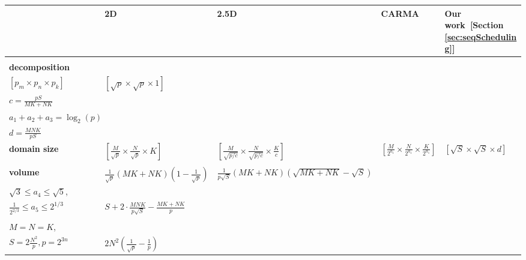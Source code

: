 \documentclass[sigplan,review,anonymous]{acmart}\settopmatter{printfolios=true,printccs=false,printacmref=false}
\begin{document}
\begin{table}
%
\setlength{\tabcolsep}{4pt}
\renewcommand{\arraystretch}{2}
\centering
\scriptsize
\sf
%
\begin{tabular}{lllll}
%
\toprule
%
 & \textbf{2D~\cite{summa}} & \textbf{2.5D~\cite{25d}} & 
 \textbf{CARMA~\cite{CARMA}} & \textbf{Our work~[Section 
 \ref{sec:seqScheduling}]} \\
%
\midrule
%
\makecell[l]{\textbf{process}\\
\textbf{decomposition} \\
$\left[p_m \times p_n \times p_k\right]$}
&
$\left[\sqrt{p} \times \sqrt{p} \times 1\right]$
&
\makecell[l]{$\left[\sqrt{p/c} \times \sqrt{p/c} \times c\right]$,\\
$c = \frac{pS}{MK + NK}$}
& 
\makecell[l]{$\left[{2^{a_1}} \times {2^{a_2}} \times {2^{a_3}}\right]$,\\
$a_1 + a_2 + a_3 = \log_2(p)$}
& 
\makecell[l]{$\left[\frac{M}{\sqrt{S}} \times \frac{N}{\sqrt{S}} \times 
\frac{K}{d}\right]$,\\
$d = \frac{MNK}{pS}$}
%
\vspace{1.0em}
%
\\
%
%
\textbf{domain size}
&
$\left[\frac{M}{\sqrt{p}} \times \frac{N}{\sqrt{p}} \times K\right]$ 
&
$\left[\frac{M}{\sqrt{p/c}} \times \frac{N}{\sqrt{p/c}} \times 
\frac{K}{c}\right]$
&
$\left[\frac{M}{2^{a_1}} \times \frac{N}{2^{a_1}} \times 
\frac{K}{2^{a_1}}\right]$
& 
$\left[{\sqrt{S}} \times {\sqrt{S}} \times {d}\right]$
%
\vspace{0.5em}
%
\\
%
\midrule
%
\makecell[l]{\textbf{communication}\\
\textbf{volume}}
&
$\frac{1}{\sqrt{p}} \left(MK + NK\right)\left(1 - \frac{1}{\sqrt{p}}\right)$
&
$\frac{1}{p \sqrt{S}} \left(MK + NK\right)\left(\sqrt{MK + NK} - 
\sqrt{S}\right)$
&
\makecell[l]{$2a_4 \cdot \frac{MNK}{p\sqrt{S}} + a_5 \cdot 
\left(\frac{MNK}{P}\right)^{2/3} - \frac{MK + NK}{p}$, \\
$\sqrt{3}\le a_4 \le \sqrt{5}$,\\
$\frac{1}{2^{2/3}} \le a_5 \le 2^{1/3}$}
& 
$S + 2 \cdot \frac{MNK}{p\sqrt{S}} - \frac{MK + NK}{p}$
%
\vspace{0.5em}
%
\\
%
\midrule
%
\makecell[l]{\textbf{``the easiest case'':}\\
$M = N = K$,\\
$S = 2\frac{N^2}{p}, p=2^{3n}$}
&
$2N^2 \left(\frac{1}{\sqrt{p}} - \frac{1}{p} \right)$

\end{tabular}
\end{table}
\end{document}
